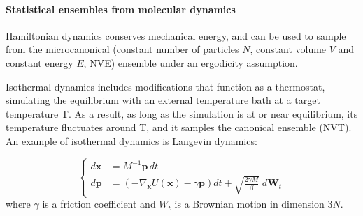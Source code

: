 \documentclass[9pt,review]{livecoms}
\newcommand{\vx}{\mathbf{x}}
\newcommand{\vp}{\mathbf{p}}
\begin{document}
\hypertarget{ref:Ensemble} {\paragraph{Statistical ensembles from molecular dynamics}}
Hamiltonian dynamics conserves mechanical energy, and can be used to sample from the microcanonical (constant number of particles $N$, constant volume $V$ and constant energy $E$, NVE) ensemble under an \hyperlink{ref:ergodic} {ergodicity} assumption.

Isothermal dynamics includes modifications that function as a thermostat, simulating the equilibrium with an external temperature bath at a target temperature T.
As a result, as long as the simulation is at or near equilibrium, its temperature fluctuates around T, and it samples the canonical ensemble (NVT).
An example of isothermal dynamics is \hypertarget{ref:Langevin} {Langevin dynamics}:

\begin{equation}
\left\{
\begin{array}{ll}
    d\vx &= M^{-1} \vp \,  dt \\
    d\vp &= \left(-\nabla_\vx U(\vx) - \gamma \vp \right) dt
    + \sqrt{ \frac{2 \gamma M}{\beta}} \; d\mathbf{W}_t
\end{array}
\right.
\end{equation}
where $\gamma$ is a friction coefficient and ${W}_t$ is a Brownian motion in dimension $3N$.
\end{document}
